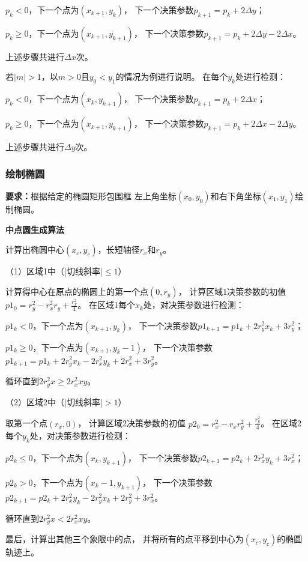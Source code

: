 \documentclass[a4paper,UTF8]{article}
\theoremstyle{definition}
\begin{document}
$p_k<0$，下一个点为$(x_{k+1},y_k)$，
下一个决策参数$p_{k+1}=p_k+2\Delta y$；

$p_k\geqslant 0$，下一个点为$(x_{k+1},y_{k+1})$，
下一个决策参数$p_{k+1}=p_k+2\Delta y-2\Delta x$。

上述步骤共进行$\Delta x$次。

若$|m|>1$，以$m>0$且$y_0<y_1$的情况为例进行说明。
在每个$y_k$处进行检测：

$p_k<0$，下一个点为$(x_k,y_{k+1})$，
下一个决策参数$p_{k+1}=p_k+2\Delta x$；

$p_k\geqslant 0$，下一个点为$(x_{k+1},y_{k+1})$，
下一个决策参数$p_{k+1}=p_k+2\Delta x-2\Delta y$。

上述步骤共进行$\Delta y$次。


\subsubsection{绘制椭圆}
\textbf{要求：}根据给定的椭圆矩形包围框
左上角坐标$(x_0,y_0)$和右下角坐标$(x_1,y_1)$绘制椭圆。

\textbf{中点圆生成算法} \cite{ref1}

计算出椭圆中心$(x_c,y_c)$，长短轴径$r_x$和$r_y$。

（1）区域1中（|切线斜率|$\leqslant 1$）

计算得中心在原点的椭圆上的第一个点$(0,r_y)$，
计算区域1决策参数的初值
$p1_0=r_y^2-r_x^2r_y+\frac{r_x^2}{4}$。
在区域1每个$x_k$处，对决策参数进行检测：

$p1_k<0$，下一个点为$(x_{k+1},y_k)$，
下一个决策参数$p1_{k+1}=p1_k+2r_y^2x_k+3r_y^2$；

$p1_k\geqslant 0$，下一个点为$(x_{k+1},y_k-1)$，
下一个决策参数$p1_{k+1}=p1_k+2r_y^2x_k-2r_x^2y_k+2r_x^2+3r_y^2$。

循环直到$2r_y^2x\geqslant 2r_x^2xy$。

（2）区域2中（|切线斜率|$>1$）

取第一个点$(r_x,0)$，
计算区域2决策参数的初值
$p2_0=r_x^2-r_xr_y^2+\frac{r_y^2}{4}$。
在区域2每个$y_k$处，对决策参数进行检测：

$p2_k\leqslant 0$，下一个点为$(x_k,y_{k+1})$，
下一个决策参数$p2_{k+1}=p2_k+2r_x^2y_k+3r_x^2$；

$p2_k>0$，下一个点为$(x_k-1,y_{k+1})$，
下一个决策参数$p2_{k+1}=p2_k+2r_x^2y_k-2r_y^2x_k+2r_y^2+3r_x^2$。

循环直到$2r_y^2x<2r_x^2xy$。

最后，计算出其他三个象限中的点，
并将所有的点平移到中心为$(x_c,y_c)$的椭圆轨迹上。
\end{document}
